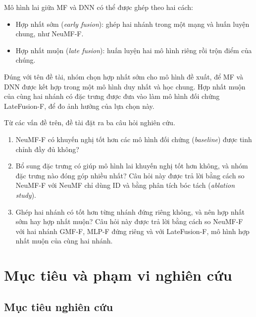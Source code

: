 Mô hình lai giữa MF và DNN có thể được ghép theo hai cách:
\begin{itemize}
    \item Hợp nhất sớm (\textit{early fusion}): ghép hai nhánh trong một mạng và huấn luyện chung, như NeuMF-F.
    \item Hợp nhất muộn (\textit{late fusion}): huấn luyện hai mô hình riêng rồi trộn điểm của chúng.
\end{itemize}

Đúng với tên đề tài, nhóm chọn hợp nhất sớm cho mô hình đề xuất, để MF và DNN được kết hợp trong một mô hình duy nhất và học chung. Hợp nhất muộn của cùng hai nhánh có đặc trưng được đưa vào làm mô hình đối chứng LateFusion-F, để đo ảnh hưởng của lựa chọn này.

Từ các vấn đề trên, đề tài đặt ra ba câu hỏi nghiên cứu.
\begin{enumerate}[label=Câu hỏi \arabic*:, leftmargin=*, align=left]
    \item NeuMF-F có khuyến nghị tốt hơn các mô hình đối chứng (\textit{baseline}) được tinh chỉnh đầy đủ không?
    \item Bổ sung đặc trưng có giúp mô hình lai khuyến nghị tốt hơn không, và nhóm đặc trưng nào đóng góp nhiều nhất? Câu hỏi này được trả lời bằng cách so NeuMF-F với NeuMF chỉ dùng ID và bằng phân tích bóc tách (\textit{ablation study}).
    \item Ghép hai nhánh có tốt hơn từng nhánh đứng riêng không, và nên hợp nhất sớm hay hợp nhất muộn? Câu hỏi này được trả lời bằng cách so NeuMF-F với hai nhánh GMF-F, MLP-F đứng riêng và với LateFusion-F, mô hình hợp nhất muộn của cùng hai nhánh.
\end{enumerate}

\section{Mục tiêu và phạm vi nghiên cứu}
\label{sec:muctieu_phamvi}

\subsection{Mục tiêu nghiên cứu}
\label{subsec:muctieu}

